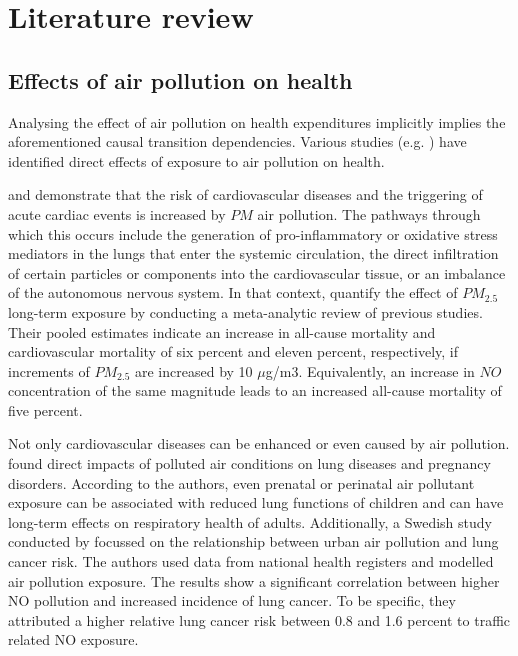 \documentclass[
]{article}
\begin{document}
	\hypertarget{literature review}{%
		\section{Literature review}\label{Literature review}}
	
	\subsection{Effects of air pollution on health}
	
	Analysing the effect of air pollution on health expenditures implicitly implies the aforementioned causal transition dependencies. Various studies (e.g. \cite{franklin2015air,NYBERG2000,LEL2015}) have identified direct effects of exposure to air pollution on health. 
	
	\cite{franklin2015air} and \cite{fiordelisi2017mechanisms} demonstrate that the risk of cardiovascular diseases and the triggering of acute cardiac events is increased by $PM$ air pollution. The pathways through which this occurs include the generation of pro-inflammatory or oxidative stress mediators in the lungs that enter the systemic circulation, the direct infiltration of certain particles or components into the cardiovascular tissue, or an imbalance of the autonomous nervous system. In that context, \cite{hoek2013long} quantify the effect of $PM_{2.5}$ long-term exposure by conducting a meta-analytic review of previous studies. Their pooled estimates indicate an increase in all-cause mortality and cardiovascular mortality of six percent and eleven percent, respectively, if increments of $PM_{2.5}$ are increased by 10 $\mu$g/m3. Equivalently, an increase in $NO$ concentration of the same magnitude leads to an increased all-cause mortality of five percent.  
	
	Not only cardiovascular diseases can be enhanced or even caused by air pollution. \cite{KIM2018} found direct impacts of polluted air conditions on lung diseases and pregnancy disorders. According to the authors, even prenatal or perinatal air pollutant exposure can be associated with reduced lung functions of children and can have long-term effects on respiratory health of adults. Additionally, a Swedish study conducted by \cite{NYBERG2000} focussed on the relationship between urban air pollution and lung cancer risk. The authors used data from national health registers and modelled air pollution exposure. The results show a significant correlation between higher NO pollution and increased incidence of lung cancer. To be specific, they attributed a higher relative lung cancer risk between 0.8 and 1.6 percent to traffic related NO exposure. 
	
\end{document}
